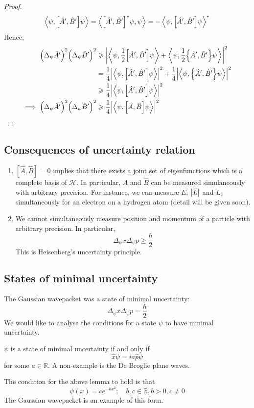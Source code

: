 \documentclass[a4paper]{article}
\begin{document}
\begin{proof}
	\[
		\left\langle{\psi, \qty[\hat A', \hat B'] \psi}\right\rangle = \left\langle{\qty[\hat A', \hat B']^* \psi, \psi}\right\rangle = -\left\langle{\psi, \qty[\hat A', \hat B'] \psi}\right\rangle^*
	\]
	Hence,
	\begin{align*}
		\qty(\Delta_\psi \hat A')^2 \qty(\Delta_\psi \hat B')^2            & \geqslant \abs{\left\langle{\psi, \frac{1}{2} \qty[\hat A', \hat B'] \psi}\right\rangle + \left\langle{\psi, \frac{1}{2} \qty{\hat A', \hat B'} \psi}\right\rangle}^2     \\
		                                                                   & = \frac{1}{4} \abs{\left\langle{\psi, \qty[\hat A', \hat B'] \psi}\right\rangle}^2 + \frac{1}{4} \abs{\left\langle{\psi, \qty{\hat A', \hat B'}\psi}\right\rangle}^2 \\
		                                                                   & \geqslant \frac{1}{4} \abs{\left\langle{\psi, \qty[\hat A', \hat B'] \psi}\right\rangle}^2                                                             \\
		\implies \qty(\Delta_\psi \hat A')^2 \qty(\Delta_\psi \hat B')^2 & \geqslant \frac{1}{4} \abs{\left\langle{\psi, \qty[\hat A, \hat B] \psi}\right\rangle}^2\qedhere
	\end{align*}
\end{proof}

\subsection{Consequences of uncertainty relation}
\begin{enumerate}
	\item \( [\hat A, \hat B] = 0 \) implies that there exists a joint set of eigenfunctions which is a complete basis of \( \mathcal H \).
	      In particular, \( \hat A \) and \( \hat B \) can be measured simulaneously with arbitrary precision.
	      For instance, we can measure \( E \), \( \abs{\overline L} \) and \( L_z \) simultaneously for an electron on a hydrogen atom (detail will be given soon).
	\item We cannot simultaneously measure position and momentum of a particle with arbitrary precision.
	      In particular,
	      \[
		      \Delta_\psi x \Delta_\psi p \geq \frac{\hbar}{2}
	      \]
	      This is Heisenberg's uncertainty principle.
\end{enumerate}

\subsection{States of minimal uncertainty}
The Gaussian wavepacket was a state of minimal uncertainty:
\[
	\Delta_\psi x \Delta_\psi p = \frac{\hbar}{2}
\]
We would like to analyse the conditions for a state \( \psi \) to have minimal uncertainty.
\begin{lemma}
	\( \psi \) is a state of minimal uncertainty if and only if
	\[
		\hat x \psi = i a \hat p \psi
	\]
	for some \( a \in \mathbb R \).
	A non-example is the De Broglie plane waves.
\end{lemma}
\begin{lemma}
	The condition for the above lemma to hold is that
	\[
		\psi(x) = ce^{-bx^2};\quad b,c \in \mathbb R, b > 0, c \neq 0
	\]
	The Gaussian wavepacket is an example of this form.
\end{lemma}
\end{document}
